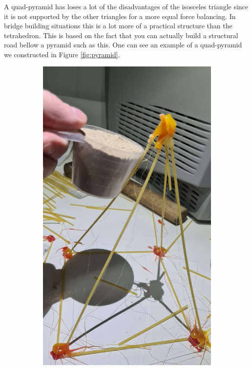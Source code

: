 \documentclass{report}
\newcommand{\subimgw}{.7\linewidth}
\begin{document}
A quad-pyramid has loses a lot of the disadvantages of the isosceles triangle since it is not supported by the other triangles for a more equal force balancing. In bridge building situations this is a lot more of a practical structure than the tetrahedron. This is based on the fact that you can actually build a structural road bellow a pyramid such as this. One can see an example of a quad-pyramid we constructed in Figure \ref{fig:pyramid}.

\begin{figure}[H]
	\begin{subfigure}{.5\textwidth}
		\centering
		\includegraphics[width=\subimgw]{pyramid-a}


\end{subfigure}
\end{figure}
\end{document}
